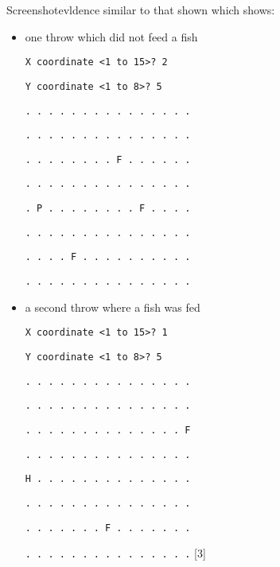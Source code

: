 Screenshotevldence similar to that shown which shows: 
\begin{itemize}
\item one throw which did not feed a fish 

\texttt{X coordinate <1 to 15>? 2 }

\texttt{Y coordinate <1 to 8>? 5 }

\texttt{. . . . . . . . . . . . . . . }

\texttt{. . . . . . . . . . . . . . .}

\texttt{. . . . . . . . F . . . . . .}

\texttt{. . . . . . . . . . . . . . .}

\texttt{. P . . . . . . . . F . . . .}

\texttt{. . . . . . . . . . . . . . .}

\texttt{. . . . F . . . . . . . . . .}

\texttt{. . . . . . . . . . . . . . .}
\item a second throw where a fish was fed 

\texttt{X coordinate <1 to 15>? 1 }

\texttt{Y coordinate <1 to 8>? 5 }

\texttt{. . . . . . . . . . . . . . . }

\texttt{. . . . . . . . . . . . . . .}

\texttt{. . . . . . . . . . . . . . F}

\texttt{. . . . . . . . . . . . . . .}

\texttt{H . . . . . . . . . . . . . .}

\texttt{. . . . . . . . . . . . . . .}

\texttt{. . . . . . . F . . . . . . .}

\texttt{. . . . . . . . . . . . . . .}\hfill{} {[}3{]}
\end{itemize}